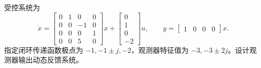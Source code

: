 \documentclass[11pt]{article}
\begin{document}
\begin{problem}[原题 7]
受控系统为
\[
 \dot x=\begin{bmatrix}0&1&0&0\\0&0&-1&0\\0&0&0&1\\0&0&5&0\end{bmatrix}x
 +\begin{bmatrix}0\\1\\0\\-2\end{bmatrix}u,
 \qquad y=\begin{bmatrix}1&0&0&0\end{bmatrix}x.
\]
指定闭环传递函数极点为 $-1,-1\pm j,-2$，观测器特征值为
$-3,-3\pm2j$。设计观测器输出动态反馈系统。
\end{problem}
\end{document}
